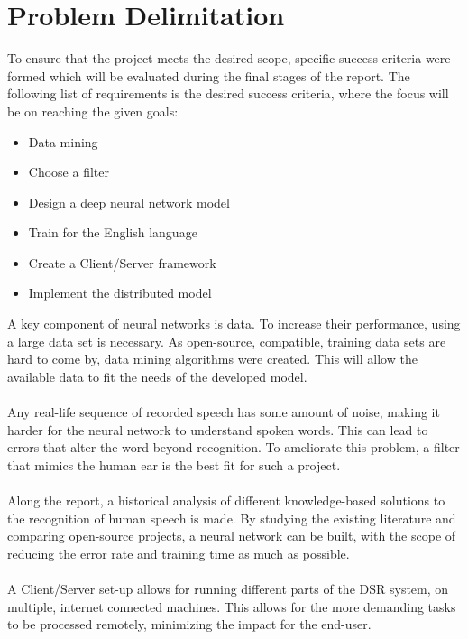 \section{Problem Delimitation}\label{sec:PD}
To ensure that the project meets the desired scope,
specific success criteria were formed which will be
evaluated during the final stages of the report.
The following list of requirements is the desired
success criteria, where the focus will be on reaching
the given goals:
\begin{itemize}
    \item Data mining
    \item Choose a filter
    \item Design a deep neural network model
    \item Train for the English language
    \item Create a Client/Server framework
    \item Implement the distributed model
\end{itemize}
A key component of neural networks is data. To increase their performance, using a large data set is necessary. As open-source, compatible, training data sets are hard to come by, data mining algorithms were created. This will allow the available data to fit the needs of the developed model.\\\\
Any real-life sequence of recorded speech has some amount of noise, making it harder for the neural network to understand spoken words.
This can lead to errors that alter the word beyond recognition. 
To ameliorate this problem, a filter that mimics the human
ear is the best fit for such a project.\\\\
Along the report, a historical analysis of different knowledge-based solutions to the recognition of human speech is made.
By studying the existing literature and comparing open-source projects, a neural network can be built, with the scope of reducing the error rate and training time as much
as possible.\\\\
A Client/Server set-up allows for running different parts of the DSR system, on multiple, internet connected machines. This allows for the more demanding tasks to be processed remotely, minimizing the impact for the end-user.